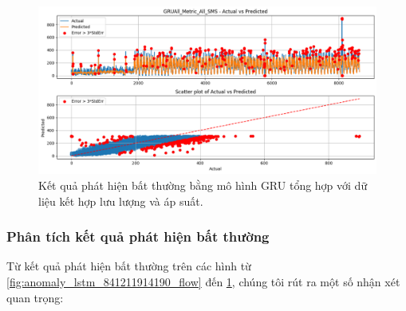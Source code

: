 \begin{figure}[H]
    \centering
    \includegraphics[width=\textwidth]{image/section6_3/anomaly_detection_combined_gru_allmetric.png}
    \caption{Kết quả phát hiện bất thường bằng mô hình GRU tổng hợp với dữ liệu kết hợp lưu lượng và áp suất.}
    \label{fig:anomaly_combined_gru_all}
\end{figure}

\subsubsection{Phân tích kết quả phát hiện bất thường}

Từ kết quả phát hiện bất thường trên các hình từ \ref{fig:anomaly_lstm_841211914190_flow} đến \ref{fig:anomaly_combined_gru_all}, chúng tôi rút ra một số nhận xét quan trọng:

